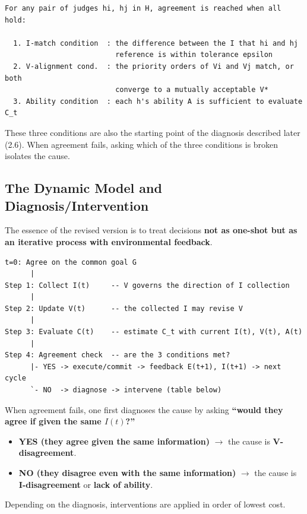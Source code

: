 \documentclass[11pt]{article}
\begin{document}
\begin{Verbatim}[frame=single,fontsize=\small]
For any pair of judges hi, hj in H, agreement is reached when all hold:

  1. I-match condition  : the difference between the I that hi and hj
                          reference is within tolerance epsilon
  2. V-alignment cond.  : the priority orders of Vi and Vj match, or both
                          converge to a mutually acceptable V*
  3. Ability condition  : each h's ability A is sufficient to evaluate C_t
\end{Verbatim}

These three conditions are also the starting point of the diagnosis described later (2.6). When agreement fails, asking which of the three conditions is broken isolates the cause.

\subsection{The Dynamic Model and Diagnosis/Intervention}

The essence of the revised version is to treat decisions \textbf{not as one-shot but as an iterative process with environmental feedback}.

\begin{Verbatim}[frame=single,fontsize=\small]
t=0: Agree on the common goal G
      |
Step 1: Collect I(t)     -- V governs the direction of I collection
      |
Step 2: Update V(t)      -- the collected I may revise V
      |
Step 3: Evaluate C(t)    -- estimate C_t with current I(t), V(t), A(t)
      |
Step 4: Agreement check  -- are the 3 conditions met?
      |- YES -> execute/commit -> feedback E(t+1), I(t+1) -> next cycle
      `- NO  -> diagnose -> intervene (table below)
\end{Verbatim}

When agreement fails, one first diagnoses the cause by asking \textbf{``would they agree if given the same $I(t)$?''}

\begin{itemize}[nosep]
  \item \textbf{YES (they agree given the same information)} $\to$ the cause is \textbf{V-disagreement}.
  \item \textbf{NO (they disagree even with the same information)} $\to$ the cause is \textbf{I-disagreement} or \textbf{lack of ability}.
\end{itemize}

Depending on the diagnosis, interventions are applied in order of lowest cost.
\end{document}
